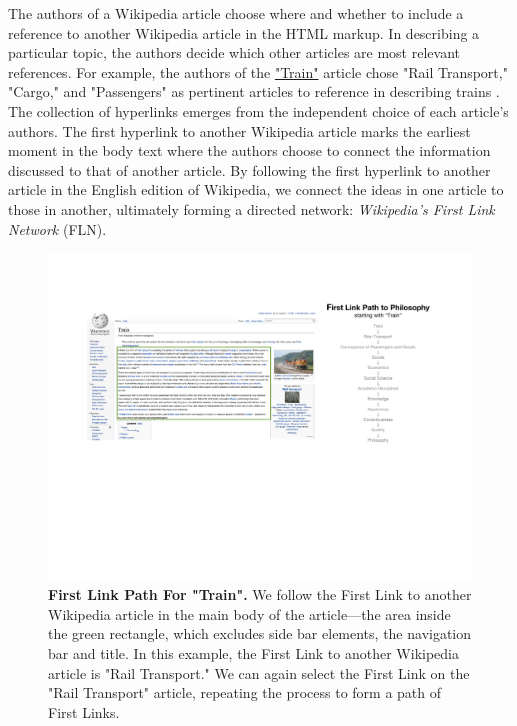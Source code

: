 \documentclass[pre,twocolumn,twoside,superscriptaddress,floatfix, aps, 10pt]{revtex4-1}
\begin{document}
The authors of a Wikipedia article choose where and whether to include a 
reference to another Wikipedia article
in the HTML markup.
In describing a particular topic, the authors decide which other articles are most
relevant references.
For example, the authors of the 
\href{https://en.wikipedia.org/wiki/Train}{"Train"}
article chose
"Rail Transport," "Cargo," and "Passengers" 
as pertinent articles to reference in describing trains
\cite{wiki_train}
.
The collection of hyperlinks emerges from the independent choice of each article's authors. 
The first hyperlink to another Wikipedia article marks the earliest moment in the body text where the authors
choose to connect the information discussed to that of another article.
By following the first hyperlink to another article in the English edition of
Wikipedia, we connect the ideas in one article to those in another, ultimately forming a directed network: 
{\it Wikipedia's First Link Network} (FLN).

\begin{figure}[tp!]
  \centering	
  \includegraphics[width=\textwidth]{graphics/Train.pdf}  
  \caption{
    \textbf{First Link Path For "Train".}
    We follow the First Link to another Wikipedia article
    in the main body of the article---the area
    inside the green rectangle, which excludes 
    side bar elements, the navigation bar and title. 
    In this example, the First Link to another Wikipedia article is "Rail Transport." 
    We can again select the First Link on the "Rail Transport"
    article, repeating the process to 
    form a path of First Links.
  }
  \label{fig:Train First Links}
\end{figure}
\end{document}
